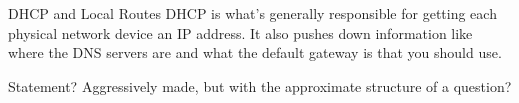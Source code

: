 \documentclass[presentation]{beamer}
\begin{document}
\begin{frame}[label={sec:orgc7c52a5}]{DHCP and Local Routes}
DHCP is what's generally responsible for getting each physical network
device an IP address. It also pushes down information like where the
DNS servers are and what the default gateway is that you should use.
\end{frame}

\begin{frame}[label={sec:org4e66a70}]{Statement?}
Aggressively made, but with the approximate structure of a question?
\end{frame}
\end{document}
